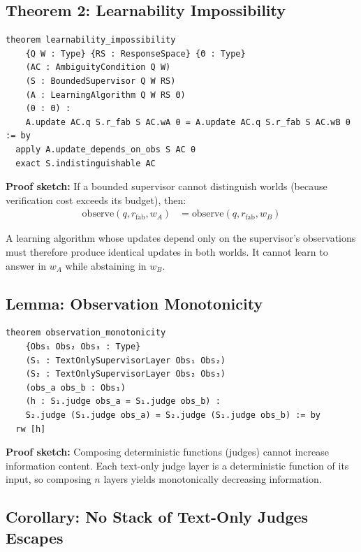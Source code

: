 \documentclass[12pt]{article}
\begin{document}
\subsection{Theorem 2: Learnability Impossibility}

\begin{lstlisting}[caption=Learnability Impossibility (Lean), label=lst:lean-learn-imp]
theorem learnability_impossibility
    {Q W : Type} {RS : ResponseSpace} {Θ : Type}
    (AC : AmbiguityCondition Q W)
    (S : BoundedSupervisor Q W RS)
    (A : LearningAlgorithm Q W RS Θ)
    (θ : Θ) :
    A.update AC.q S.r_fab S AC.wA θ = A.update AC.q S.r_fab S AC.wB θ := by
  apply A.update_depends_on_obs S AC θ
  exact S.indistinguishable AC
\end{lstlisting}

\textbf{Proof sketch:} If a bounded supervisor cannot distinguish worlds (because verification cost exceeds its budget), then:
\begin{align}
\text{observe}(q, r_{\text{fab}}, w_A) &= \text{observe}(q, r_{\text{fab}}, w_B)
\end{align}

A learning algorithm whose updates depend only on the supervisor's observations must therefore produce identical updates in both worlds. It cannot learn to answer in $w_A$ while abstaining in $w_B$.

\subsection{Lemma: Observation Monotonicity}

\begin{lstlisting}[caption=Observation Monotonicity (Lean), label=lst:lean-mono]
theorem observation_monotonicity
    {Obs₁ Obs₂ Obs₃ : Type}
    (S₁ : TextOnlySupervisorLayer Obs₁ Obs₂)
    (S₂ : TextOnlySupervisorLayer Obs₂ Obs₃)
    (obs_a obs_b : Obs₁)
    (h : S₁.judge obs_a = S₁.judge obs_b) :
    S₂.judge (S₁.judge obs_a) = S₂.judge (S₁.judge obs_b) := by
  rw [h]
\end{lstlisting}

\textbf{Proof sketch:} Composing deterministic functions (judges) cannot increase information content. Each text-only judge layer is a deterministic function of its input, so composing $n$ layers yields monotonically decreasing information.

\subsection{Corollary: No Stack of Text-Only Judges Escapes}
\end{document}
